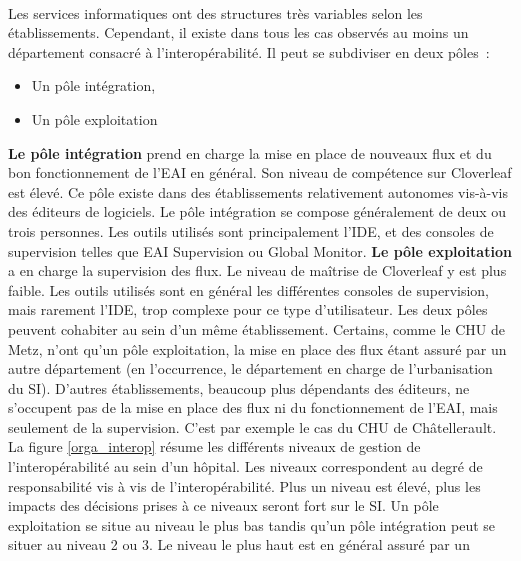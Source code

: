 			\paragraph{}%
			Les services informatiques ont des structures très variables selon les
			établissements. Cependant, il existe dans tous les cas observés au moins un
			département consacré à l’interopérabilité. Il peut se subdiviser
			en deux pôles~:
			\begin{itemize}
			  \item Un pôle intégration,
			  \item Un pôle exploitation
			\end{itemize}
			\textbf{Le pôle intégration} prend en charge la mise en place de nouveaux
			flux et du bon fonctionnement de l’EAI en général. Son niveau de compétence sur
			Cloverleaf est élevé. Ce pôle existe dans des établissements
			relativement autonomes vis-à-vis des éditeurs de logiciels. Le pôle
			intégration se compose généralement de deux ou trois personnes. Les outils
			utilisés sont principalement l’IDE, et des consoles de supervision telles que EAI
			Supervision ou Global Monitor.\newline
			\textbf{Le pôle exploitation} a en charge la supervision des flux. Le niveau
			de maîtrise de Cloverleaf y est plus faible. Les outils utilisés sont en
			général les différentes consoles de supervision,
			mais rarement l’IDE, trop complexe pour ce type d’utilisateur.\newline
			Les deux pôles peuvent cohabiter au sein d’un même établissement. Certains,
			comme le CHU de Metz, n’ont qu’un pôle exploitation, la mise en place des
			flux étant assuré par un autre département (en l’occurrence, le département
			en charge de l’urbanisation du SI). D’autres établissements, beaucoup plus
			dépendants des éditeurs, ne s’occupent pas de la mise en place des flux ni
			du fonctionnement de l’EAI, mais seulement de la supervision. C’est par
			exemple le cas du CHU de Châtellerault.\newline 
			La figure \ref{orga_interop} résume les
			différents niveaux de gestion de l’interopérabilité au sein d’un hôpital.
			Les niveaux correspondent au degré de responsabilité vis à vis de
			l'interopérabilité. Plus un niveau est élevé, plus les impacts des
			décisions prises à ce niveaux seront fort sur le SI. Un pôle exploitation se
			situe au niveau le plus bas tandis qu’un pôle intégration peut se situer au
			niveau 2 ou 3. Le niveau le plus haut est en général assuré par un
